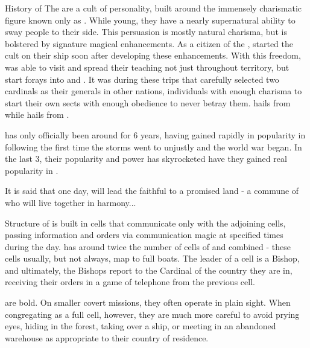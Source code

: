 \documentclass[blue]{GL2020}
\begin{document}


History of \pCult{}
The \pCult{} are a cult of personality, built around the immensely charismatic figure known only as \cCultLeader{}. While young, they have a nearly supernatural ability to sway people to their side. This persuasion is mostly natural charisma, but is bolstered by signature magical enhancements. As a citizen of the \pViking{}, \cCultLeader{} started the cult on their ship soon after developing these enhancements. With this freedom, \cCultLeader{\they} was able to visit and spread their teaching not just throughout \pViking{} territory, but start forays into \pTech{} and \pFarm{}. It was during these trips that \cCultLeader{} carefully selected two cardinals as their generals in other nations, individuals with enough charisma to start their own sects with enough obedience to never betray them. \cTechCardinal{} hails from \pTech{} while \cFarmCardinal{} hails from \pFarm{}.

\pCult{} has only officially been around for 6 years, having gained rapidly in popularity  in \pViking{} following the first time the storms went to \pViking{} unjustly and the world war began. In the last 3, their popularity and power has skyrocketed have they gained real popularity in \pViking{}.

It is said that one day, \cCultLeader{} will lead the faithful to a promised land - a commune of \pCult{\member} who will live together in harmony...

Structure of \pCult{}
\pCult{} is built in cells that communicate only with the adjoining cells, passing information and orders via communication magic at specified times during the day. \pViking{} has around twice the number of cells of \pTech{} and \pFarm{} combined - these cells usually, but not always, map to full boats. The leader of a cell is a Bishop, and ultimately, the Bishops report to the Cardinal of the country they are in, receiving their orders in a game of telephone from the previous cell.

\pCult{} are bold. On smaller covert missions, they often operate in plain sight. When congregating as a full cell, however, they are much more careful to avoid prying eyes, hiding in the forest, taking over a ship, or meeting in an abandoned warehouse as appropriate to their country of residence.
\end{document}
